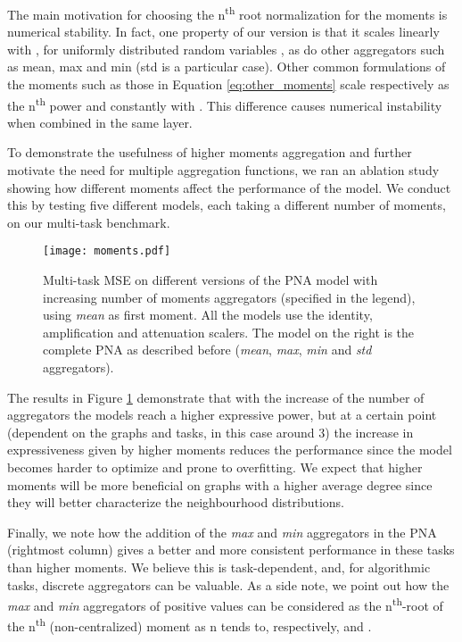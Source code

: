 \documentclass{article}
\begin{document}
The main motivation for choosing the n\textsuperscript{th} root normalization for the moments is numerical stability. In fact, one property of our version is that it scales linearly with , for uniformly distributed random variables , as do other aggregators such as mean, max and min (std is a particular case). Other common formulations of the moments such as those in Equation \ref{eq:other_moments} scale respectively as the n\textsuperscript{th} power and constantly with . This difference causes numerical instability when combined in the same layer.

To demonstrate the usefulness of higher moments aggregation and further motivate the need for multiple aggregation functions, we ran an ablation study showing how different moments affect the performance of the model. We conduct this by testing five different models, each taking a different number of moments, on our multi-task benchmark.

\begin{figure}[h]
\centering
\texttt{[image: moments.pdf]}
\vspace{15pt}
\caption{Multi-task  MSE on different versions of the PNA model with increasing number of moments aggregators (specified in the legend), using \textit{mean} as first moment. All the models use the identity, amplification and attenuation scalers. The model on the right is the complete PNA as described before (\textit{mean}, \textit{max}, \textit{min} and \textit{std} aggregators).}
\label{fig:moments_plot}
\end{figure} 

The results in Figure \ref{fig:moments_plot} demonstrate that with the increase of the number of aggregators the models reach a higher expressive power, but at a certain point (dependent on the graphs and tasks, in this case around 3) the increase in expressiveness given by higher moments reduces the performance since the model becomes harder to optimize and prone to overfitting. We expect that higher moments will be more beneficial on graphs with a higher average degree since they will better characterize the neighbourhood distributions. 

Finally, we note how the addition of the \textit{max} and \textit{min} aggregators in the PNA (rightmost column) gives a better and more consistent performance in these tasks than higher moments. We believe this is task-dependent, and, for algorithmic tasks, discrete aggregators can be valuable. As a side note, we point out how the \textit{max} and \textit{min} aggregators of positive values can be considered as the n\textsuperscript{th}-root of the n\textsuperscript{th} (non-centralized) moment as n tends to, respectively,  and .
\end{document}
